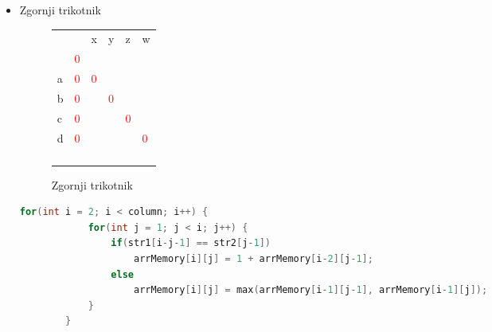 \documentclass[a4paper,12pt,openright]{book}
\begin{document}
\begin{itemize}
        \begin{lstlisting}[language=C++, caption={Inicializacija začetnih vrednosti za LCS}, captionpos=b, label=diagonalMemory1]
        for (int i = 0; i < row; i++)
            arrMemory[i][0] = 0;
        for (int j = 1; j < column; j++)
            arrMemory[j][j] = 0;
        \end{lstlisting}
    
    \item Zgornji trikotnik
    
        \begin{figure}[htb]
        \begin{center}
\begin{tabular}{|l|l|l|l|l|l|}
\cline{3-6}
  \multicolumn{2}{c|}{}  & x & y & z & w\\ \cline{2-6}
 \multicolumn{1}{c|}{} & \textcolor{red}{0} & \multicolumn{4}{c}{} \\ \cline{1-3}
a  & \textcolor{red}{0} & \textcolor{red}{0} &  \multicolumn{3}{c}{} \\ \cline{1-4}
b  & \textcolor{red}{0} & \cellcolor{blue!15} & \textcolor{red}{0} & \multicolumn{2}{c}{}  \\ \cline{1-5}
c  & \textcolor{red}{0} & \cellcolor{blue!15} & \cellcolor{blue!15} & \textcolor{red}{0} & \multicolumn{1}{c}{} \\ \cline{1-6}
d  & \textcolor{red}{0} & \cellcolor{blue!15} & \cellcolor{blue!15} & \cellcolor{blue!15} & \textcolor{red}{0} \\ \hline
 \multicolumn{1}{c|}{} &  & \textcolor{brown}{} & \textcolor{purple}{} & \textcolor{blue}{} & \multicolumn{1}{c}{}  \\ \cline{2-5}
\multicolumn{1}{c|}{}  &  & \textcolor{brown}{} & \textcolor{purple}{} & \multicolumn{2}{c}{}   \\ \cline{2-4}
\multicolumn{1}{c|}{}  &  & \textcolor{brown}{} &  \multicolumn{3}{c}{}   \\ \cline{2-3}
\multicolumn{1}{c|}{}  &  & \multicolumn{4}{c}{}  \\ \cline{2-2}
\end{tabular}
        \end{center}
        \caption{Zgornji trikotnik}
        \label{diagMemory2}
        \end{figure}
        
        \begin{lstlisting}[language=C++, caption={Izračun zgornjega trikotnika za LCS}, captionpos=b, label=diagonalMemory2]
        for(int i = 2; i < column; i++) {
            for(int j = 1; j < i; j++) {
                if(str1[i-j-1] == str2[j-1])
                    arrMemory[i][j] = 1 + arrMemory[i-2][j-1];
                else
                    arrMemory[i][j] = max(arrMemory[i-1][j-1], arrMemory[i-1][j]);
            }
        }
        \end{lstlisting}


\end{itemize}
\end{document}
